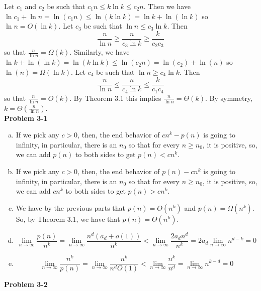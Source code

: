 \documentclass{article}
\begin{document}
Let $c_1$ and $c_2$ be such that $ c_1 n \leq k \ln k \leq c_2 n$.  Then we have $ \ln c_1 + \ln n= \ln(c_1 n) \leq \ln(k \ln k) = \ln k + \ln ( \ln k)$ so $\ln n = O(\ln k)$.  Let $c_3$ be such that $\ln n \leq c_3 \ln k$.  Then 
\[ \frac{n}{\ln n} \geq \frac{n}{c_3 \ln k} \geq \frac{k}{c_2 c_3} \]
so that $\frac{n}{\ln n} = \Omega(k)$.  Similarly, we have $ \ln k + \ln ( \ln k) = \ln (k \ln k) \leq \ln(c_2 n) = \ln(c_2) + \ln(n)$ so $\ln(n) = \Omega(\ln k)$.  Let $c_4$ be such that $\ln n \geq c_4 \ln k$.  Then
\[ \frac{n}{\ln n} \leq \frac{n}{c_4 \ln k} \leq \frac{k}{c_1 c_4} \]
so that $\frac{n}{\ln n} = O(k)$.  By Theorem 3.1 this implies $\frac{n}{\ln n} = \Theta(k)$.  By symmetry, $k = \Theta\left(\frac{n}{\ln n}\right)$. \\

\noindent\textbf{Problem 3-1}\\

\begin{enumerate}[a.]
\item
If we pick any $c>0$, then, the end behavior of $cn^k -p(n)$ is going to infinity, in particular, there is an $n_0$ so that for every $n\ge n_0$, it is positive, so, we can add $p(n)$ to both sides to get $p(n)<cn^k$.

\item
If we pick any $c>0$, then, the end behavior of $p(n)- cn^k$ is going to infinity, in particular, there is an $n_0$ so that for every $n\ge n_0$, it is positive, so, we can add $cn^k$ to both sides to get $p(n)>cn^k$.

\item
We have by the previous parts that $p(n) = O(n^k)$ and $p(n)= \Omega(n^k)$. So, by Theorem 3.1, we have that $p(n) = \Theta(n^k)$.

\item
\[
\lim_{n\rightarrow\infty} \frac{p(n)}{n^k} = \lim_{n\rightarrow\infty} \frac{n^d(a_d + o(1))}{n^k} < \lim_{n\rightarrow\infty} \frac{2a_dn^d}{n^k} = 2a_d\lim_{n\rightarrow\infty} n^{d-k} = 0
\]


\item
\[
\lim_{n\rightarrow\infty} \frac{n^k}{p(n)} = \lim_{n\rightarrow\infty} \frac{n^k}{n^d O(1)} < \lim_{n\rightarrow\infty} \frac{n^k}{n^d} = \lim_{n\rightarrow\infty} n^{k-d} = 0
\]

\end{enumerate}

\noindent\textbf{Problem 3-2}\\
\end{document}
